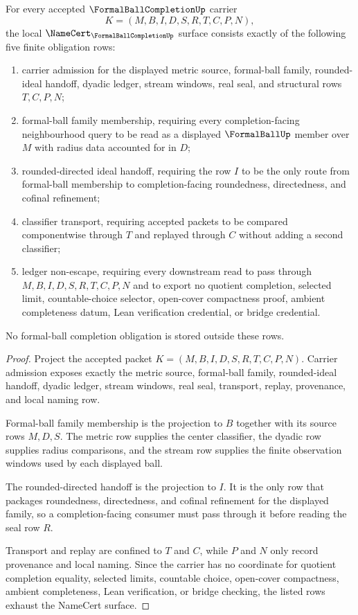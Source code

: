 \begin{theorem}
\label{thm:formal-ball-completion-namecert-obligations}
For every accepted $\FormalBallCompletionUp$ carrier
$$
K=(M,B,I,D,S,R,T,C,P,N),
$$
the local $\NameCert_{\FormalBallCompletionUp}$ surface consists exactly of the following five finite obligation rows:
\begin{enumerate}
\item carrier admission for the displayed metric source, formal-ball family, rounded-ideal handoff, dyadic ledger, stream windows, real seal, and structural rows $T,C,P,N$;
\item formal-ball family membership, requiring every completion-facing neighbourhood query to be read as a displayed $\FormalBallUp$ member over $M$ with radius data accounted for in $D$;
\item rounded-directed ideal handoff, requiring the row $I$ to be the only route from formal-ball membership to completion-facing roundedness, directedness, and cofinal refinement;
\item classifier transport, requiring accepted packets to be compared componentwise through $T$ and replayed through $C$ without adding a second classifier;
\item ledger non-escape, requiring every downstream read to pass through $M,B,I,D,S,R,T,C,P,N$ and to export no quotient completion, selected limit, countable-choice selector, open-cover compactness proof, ambient completeness datum, Lean verification credential, or bridge credential.
\end{enumerate}
No formal-ball completion obligation is stored outside these rows.
\end{theorem}
\begin{proof}
Project the accepted packet $K=(M,B,I,D,S,R,T,C,P,N)$. Carrier admission exposes exactly the metric source, formal-ball family, rounded-ideal handoff, dyadic ledger, stream windows, real seal, transport, replay, provenance, and local naming row.

Formal-ball family membership is the projection to $B$ together with its source rows $M,D,S$. The metric row supplies the center classifier, the dyadic row supplies radius comparisons, and the stream row supplies the finite observation windows used by each displayed ball.

The rounded-directed handoff is the projection to $I$. It is the only row that packages roundedness, directedness, and cofinal refinement for the displayed family, so a completion-facing consumer must pass through it before reading the seal row $R$.

Transport and replay are confined to $T$ and $C$, while $P$ and $N$ only record provenance and local naming. Since the carrier has no coordinate for quotient completion equality, selected limits, countable choice, open-cover compactness, ambient completeness, Lean verification, or bridge checking, the listed rows exhaust the NameCert surface.
\end{proof}

